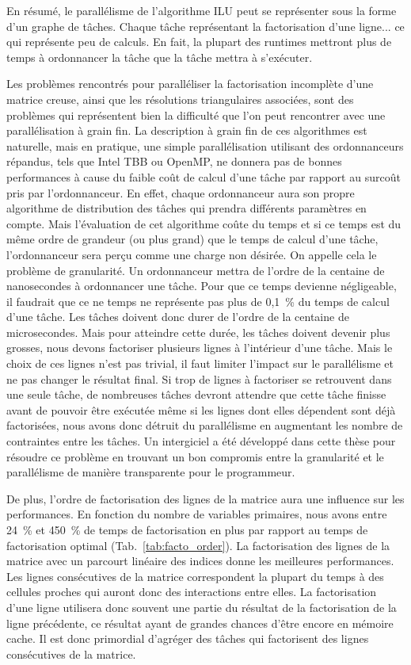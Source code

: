En résumé, le parallélisme de l'algorithme ILU peut se représenter sous la forme d'un graphe de tâches.
%
Chaque tâche représentant la factorisation d'une ligne... ce qui représente peu de calculs.
%
En fait, la plupart des runtimes mettront plus de temps à ordonnancer la tâche que la tâche mettra à s'exécuter.

Les problèmes rencontrés pour paralléliser la factorisation incomplète d'une matrice creuse, ainsi que les résolutions triangulaires associées, sont des problèmes qui représentent bien la difficulté que l'on peut rencontrer avec une parallélisation à grain fin.
%
La description à grain fin de ces algorithmes est naturelle, mais en pratique, une simple parallélisation utilisant des ordonnanceurs répandus, tels que Intel TBB ou OpenMP, ne donnera pas de bonnes performances à cause du faible coût de calcul d'une tâche par rapport au surcoût pris par l'ordonnanceur.
%
En effet, chaque ordonnanceur aura son propre algorithme de distribution des tâches qui prendra différents paramètres en compte.
%
Mais l'évaluation de cet algorithme coûte du temps et si ce temps est du même ordre de grandeur (ou plus grand) que le temps de calcul d'une tâche, l'ordonnanceur sera perçu comme une charge non désirée.
%
On appelle cela le problème de granularité.
%
Un ordonnanceur mettra de l'ordre de la centaine de nanosecondes à ordonnancer une tâche.
%
Pour que ce temps devienne négligeable, il faudrait que ce ne temps ne représente pas plus de 0,1~\% du temps de calcul d'une tâche.
%
Les tâches doivent donc durer de l'ordre de la centaine de microsecondes.
%
Mais pour atteindre cette durée, les tâches doivent devenir plus grosses, nous devons factoriser plusieurs lignes à l'intérieur d'une tâche.
%
Mais le choix de ces lignes n'est pas trivial, il faut limiter l'impact sur le parallélisme et ne pas changer le résultat final.
%
Si trop de lignes à factoriser se retrouvent dans une seule tâche, de nombreuses tâches devront attendre que cette tâche finisse avant de pouvoir être exécutée même si les lignes dont elles dépendent sont déjà factorisées, nous avons donc détruit du parallélisme en augmentant les nombre de contraintes entre les tâches.
%
Un intergiciel a été développé dans cette thèse pour résoudre ce problème en trouvant un bon compromis entre la granularité et le parallélisme de manière transparente pour le programmeur.

De plus, l'ordre de factorisation des lignes de la matrice aura une influence sur les performances.
%
En fonction du nombre de variables primaires, nous avons entre 24~\% et 450~\% de temps de factorisation en plus par rapport au temps de factorisation optimal (Tab.~\ref{tab:facto_order}).
%
La factorisation des lignes de la matrice avec un parcourt linéaire des indices donne les meilleures performances.
%
Les lignes consécutives de la matrice correspondent la plupart du temps à des cellules proches qui auront donc des interactions entre elles.
%
La factorisation d'une ligne utilisera donc souvent une partie du résultat de la factorisation de la ligne précédente, ce résultat ayant de grandes chances d'être encore en mémoire cache.
%
Il est donc primordial d'agréger des tâches qui factorisent des lignes consécutives de la matrice.

